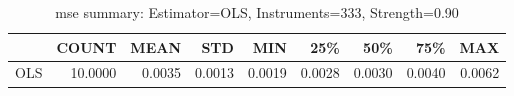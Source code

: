 \begin{table}[ht]
\centering
\caption{mse summary: Estimator=OLS, Instruments=333, Strength=0.90}
\begin{tabular}{lrrrrrrrr}
\toprule
 & COUNT & MEAN & STD & MIN & 25\% & 50\% & 75\% & MAX \\
\midrule
OLS & 10.0000 & 0.0035 & 0.0013 & 0.0019 & 0.0028 & 0.0030 & 0.0040 & 0.0062 \\
\bottomrule
\end{tabular}
\end{table}
